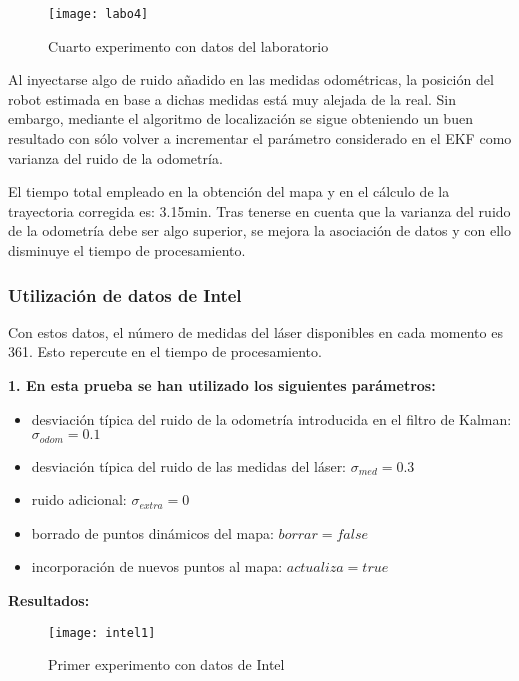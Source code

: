 \begin{figure}[h]
  \centering\texttt{[image: labo4]}\\
  \caption{Cuarto experimento con datos del laboratorio}\label{fg:labo4}
\end{figure}

Al inyectarse algo de ruido añadido en las medidas odométricas, la posición del robot estimada en base a dichas medidas está muy alejada de la real. Sin embargo, mediante el algoritmo de localización se sigue obteniendo un buen resultado con sólo volver a incrementar el parámetro considerado en el EKF como varianza del ruido de la odometría.

El tiempo total empleado en la obtención del mapa y en el cálculo de la trayectoria corregida es: 3.15min. Tras tenerse en cuenta que la varianza del ruido de la odometría debe ser algo superior, se mejora la asociación de datos y con ello disminuye el tiempo de procesamiento.


\subsubsection{Utilización de datos de Intel}
Con estos datos, el número de medidas del láser disponibles en cada momento es 361. Esto repercute en el tiempo de procesamiento.

\noindent
\textbf{\textbf{1.} En esta prueba se han utilizado los siguientes parámetros:}
\begin{itemize}
  \item desviación típica del ruido de la odometría introducida en el filtro de Kalman: $\sigma_{odom} = 0.1$
  \item desviación típica del ruido de las medidas del láser: $\sigma_{med} = 0.3$
  \item ruido adicional: $\sigma_{extra} = 0$
  \item borrado de puntos dinámicos del mapa: $borrar = false$
  \item incorporación de nuevos puntos al mapa: $actualiza = true$
\end{itemize}


\textbf{Resultados:}


\begin{figure}[h]
  \centering\texttt{[image: intel1]}\\
  \caption{Primer experimento con datos de Intel}\label{fg:intel1}
\end{figure}

